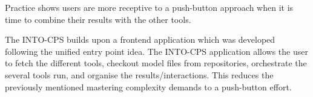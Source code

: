 Practice shows users are more receptive to a  push-button approach when it is
time to combine their results with the other tools.  

The INTO-CPS builds upon a frontend application which was developed following the
unified entry point idea.  The INTO-CPS application allows the user to fetch
the different tools, checkout model files from repositories, orchestrate the
several tools run, and organise the results/interactions.  This reduces the
previously mentioned mastering complexity demands to a push-button effort.
 


